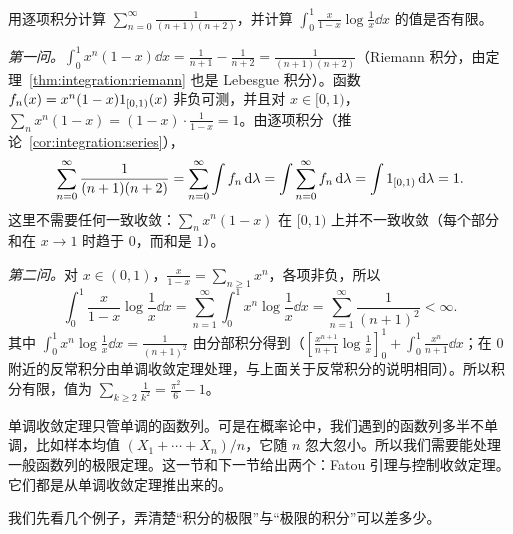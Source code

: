 \begin{workedexample}\label{we:integration:series-telescoping}
用逐项积分计算 $\displaystyle\sum_{n=0}^\infty\frac1{(n+1)(n+2)}$，并计算 $\displaystyle\int_0^1\frac{x}{1-x}\log\frac1x\dd x$ 的值是否有限。
\end{workedexample}
\begin{solution}
\emph{第一问。}$\int_0^1x^n(1-x)\dd x=\frac1{n+1}-\frac1{n+2}=\frac1{(n+1)(n+2)}$（Riemann 积分，由定理~\ref{thm:integration:riemann} 也是 Lebesgue 积分）。函数 $f_n(x)=x^n(1-x)1_{[0,1)}(x)$ 非负可测，并且对 $x\in[0,1)$，$\sum_nx^n(1-x)=(1-x)\cdot\frac1{1-x}=1$。由逐项积分（推论~\ref{cor:integration:series}），
\[
\sum_{n=0}^\infty\frac1{(n+1)(n+2)}=\sum_{n=0}^\infty\int f_n\,\mathrm{d}\lambda=\int\sum_{n=0}^\infty f_n\,\mathrm{d}\lambda=\int1_{[0,1)}\,\mathrm{d}\lambda=1 .
\]
这里不需要任何一致收敛：$\sum_nx^n(1-x)$ 在 $[0,1)$ 上并不一致收敛（每个部分和在 $x\to1$ 时趋于 $0$，而和是 $1$）。

\emph{第二问。}对 $x\in(0,1)$，$\frac x{1-x}=\sum_{n\geqslant1}x^n$，各项非负，所以
\[
\int_0^1\frac x{1-x}\log\frac1x\dd x=\sum_{n=1}^\infty\int_0^1x^n\log\frac1x\dd x=\sum_{n=1}^\infty\frac1{(n+1)^2}<\infty .
\]
其中 $\int_0^1x^n\log\frac1x\dd x=\frac1{(n+1)^2}$ 由分部积分得到（$[\frac{x^{n+1}}{n+1}\log\frac1x]_0^1+\int_0^1\frac{x^n}{n+1}\dd x$；在 $0$ 附近的反常积分由单调收敛定理处理，与上面关于反常积分的说明相同）。所以积分有限，值为 $\sum_{k\geqslant2}\frac1{k^2}=\frac{\pi^2}6-1$。
\end{solution}


单调收敛定理只管单调的函数列。可是在概率论中，我们遇到的函数列多半不单调，比如样本均值 $(X_1+\cdots+X_n)/n$，它随 $n$ 忽大忽小。所以我们需要能处理一般函数列的极限定理。这一节和下一节给出两个：Fatou 引理与控制收敛定理。它们都是从单调收敛定理推出来的。

我们先看几个例子，弄清楚“积分的极限”与“极限的积分”可以差多少。


